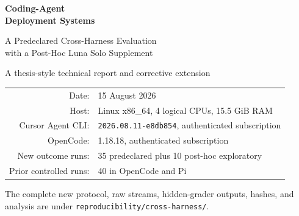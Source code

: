 \documentclass[11pt,oneside]{article}
\begin{document}
\hypersetup{pageanchor=false}
\begin{titlepage}
  \centering
  \vspace*{1.5cm}
  {\Huge\bfseries\color{ink}Coding-Agent\\[0.2em]Deployment Systems\par}
  \vspace{0.7cm}
  {\LARGE A Predeclared Cross-Harness Evaluation\\with a Post-Hoc Luna Solo Supplement\par}
  \vspace{1.2cm}
  {\large A thesis-style technical report and corrective extension\par}
  \vfill
  \begin{tabular}{rl}
    Date: & 15 August 2026 \\
    Host: & Linux x86\_64, 4 logical CPUs, 15.5 GiB RAM \\
    Cursor Agent CLI: & \texttt{2026.08.11-e8db854}, authenticated subscription \\
    OpenCode: & 1.18.18, authenticated subscription \\
    New outcome runs: & 35 predeclared plus 10 post-hoc exploratory \\
    Prior controlled runs: & 40 in OpenCode and Pi \\
  \end{tabular}
  \vfill
  {\color{muted}\small
  The complete new protocol, raw streams, hidden-grader outputs, hashes, and
  analysis are under \texttt{reproducibility/cross-harness/}.
  }
\end{titlepage}
\hypersetup{pageanchor=true}
\end{document}
